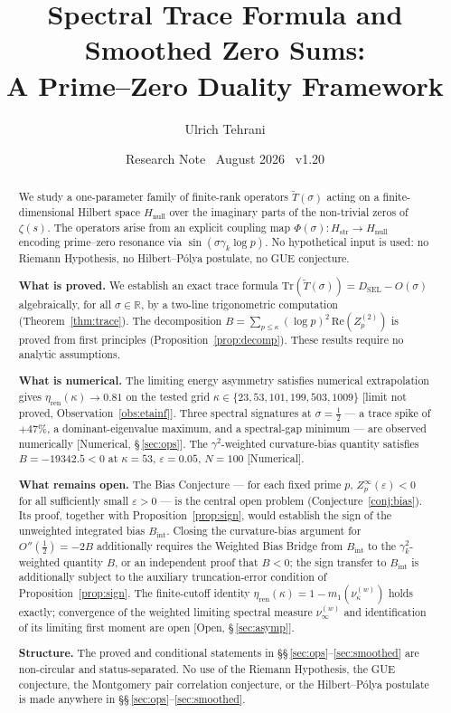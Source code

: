 \documentclass[11pt]{article}
\title{\vspace{-1.5em}\bfseries Spectral Trace Formula and Smoothed Zero Sums:\\[0.4em]
\large A Prime--Zero Duality Framework}
\author{Ulrich Tehrani}
\date{Research Note \textperiodcentered\ August 2026
      \textperiodcentered\ v1.20}
\newcommand{\Hstr}{H_{\mathrm{str}}}
\newcommand{\Hnull}{H_{\mathrm{null}}}
\newcommand{\etaren}{\eta_{\mathrm{ren}}}
\newcommand{\Tt}{\widetilde{T}}
\newcommand{\DSEL}{D_{\mathrm{SEL}}}
\begin{document}
\maketitle

\begin{abstract}
We study a one-parameter family of finite-rank operators $\Tt(\sigma)$
acting on a finite-dimensional Hilbert space $\Hnull$ over the imaginary
parts of the non-trivial zeros of $\zeta(s)$.
The operators arise from an explicit coupling map
$\Phi(\sigma)\colon\Hstr\to\Hnull$
encoding prime--zero resonance via
$\sin(\sigma\gamma_k\log p)$.
No hypothetical input is used: no Riemann Hypothesis,
no Hilbert--P\'olya postulate, no GUE conjecture.

\textbf{What is proved.}
We establish an exact trace formula
$\mathrm{Tr}(\Tt(\sigma)) = \DSEL - O(\sigma)$
algebraically, for all $\sigma\in\mathbb{R}$, by a two-line
trigonometric computation (Theorem~\ref{thm:trace}).
The decomposition $B = \sum_{p\leq\kappa}(\log p)^2\,\mathrm{Re}(Z_p^{(2)})$
is proved from first principles (Proposition~\ref{prop:decomp}).
These results require no analytic assumptions.

\textbf{What is numerical.}
The limiting energy asymmetry satisfies
numerical extrapolation gives $\etaren(\kappa)\to 0.81$
on the tested grid $\kappa\in\{23,53,101,199,503,1009\}$
[limit not proved, Observation~\ref{obs:etainf}].
Three spectral signatures at $\sigma=\tfrac{1}{2}$ --- a trace spike
of $+47\%$, a dominant-eigenvalue maximum, and a spectral-gap minimum
--- are observed numerically [Numerical, \S\,\ref{sec:ops}].
The $\gamma^2$-weighted curvature-bias quantity satisfies $B = -19342.5 < 0$
at $\kappa=53$, $\varepsilon=0.05$, $N=100$ [Numerical].

\textbf{What remains open.}
The Bias Conjecture --- for each fixed prime $p$,
$Z_p^\infty(\varepsilon)<0$ for all
sufficiently small $\varepsilon>0$ --- is the
central open problem (Conjecture~\ref{conj:bias}).
Its proof, together with Proposition~\ref{prop:sign},
would establish the sign of the unweighted integrated bias
$B_{\mathrm{int}}$.
Closing the curvature-bias argument for $O''(\tfrac{1}{2})=-2B$
additionally requires the Weighted Bias Bridge from $B_{\mathrm{int}}$
to the $\gamma_k^2$-weighted quantity $B$,
or an independent proof that $B<0$; the sign transfer to
$B_{\mathrm{int}}$ is additionally subject to the auxiliary
truncation-error condition of Proposition~\ref{prop:sign}.
The finite-cutoff identity $\etaren(\kappa)=1-m_1(\nu_\kappa^{(w)})$
holds exactly; convergence of the weighted limiting spectral measure
$\nu_\infty^{(w)}$ and identification of its limiting first moment are open
[Open, \S\,\ref{sec:asymp}].

\textbf{Structure.}
The proved and conditional statements in
\S\S\,\ref{sec:ops}--\ref{sec:smoothed}
are non-circular and status-separated.
No use of the Riemann Hypothesis, the GUE conjecture,
the Montgomery pair correlation conjecture, or the Hilbert--P\'olya
postulate is made anywhere in \S\S\,\ref{sec:ops}--\ref{sec:smoothed}.
\end{abstract}
\end{document}
